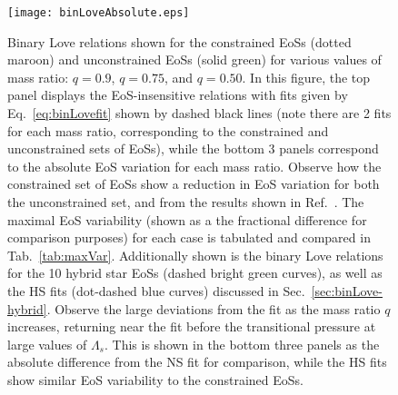 \documentclass[prd,twocolumn,nofootinbib,superscriptaddress,amsmath,amssymb]{revtex4-1}
\begin{document}
{}

{}
  
\begin{figure}
\begin{center} 
\texttt{[image: binLoveAbsolute.eps]}%
\end{center}
\caption{
Binary Love relations shown for the constrained EoSs (dotted maroon) and unconstrained EoSs (solid green) for various values of mass ratio: $q=0.9$, $q=0.75$, and $q=0.50$.
In this figure, the top panel displays the EoS-insensitive relations with fits given by Eq.~\ref{eq:binLovefit} shown by dashed black lines (note there are 2 fits for each mass ratio, corresponding to the constrained and unconstrained sets of EoSs), while the bottom 3 panels correspond to the absolute EoS variation for each mass ratio.
Observe how the constrained set of EoSs show a reduction in EoS variation for both the unconstrained set, and from the results shown in Ref.~\cite{Yagi:binLove}.
The maximal EoS variability (shown as a the fractional difference for comparison purposes) for each case is tabulated and compared in Tab.~\ref{tab:maxVar}.
Additionally shown is the binary Love relations for the 10 hybrid star EoSs (dashed bright green curves), as well as the HS fits (dot-dashed blue curves) discussed in Sec.~\ref{sec:binLove-hybrid}.
Observe the large deviations from the fit as the mass ratio $q$ increases, returning near the fit before the transitional pressure at large values of $\Lambda_s$.
This is shown in the bottom three panels as the absolute difference from the NS fit for comparison, while the HS fits show similar EoS variability to the constrained EoSs.
}
\label{fig:binLove}
\end{figure} 
\end{document}
